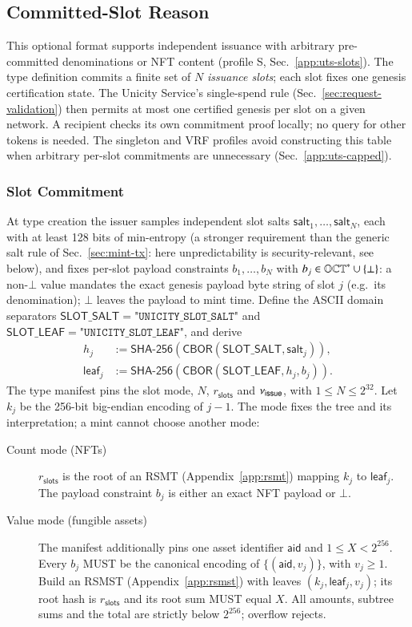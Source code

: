 \subsection{Committed-Slot Reason}\label{app:reason-slot}

This optional format supports independent issuance with arbitrary pre-committed denominations or NFT content (profile S, Sec.~\ref{app:uts-slots}). The type definition commits a finite set of $N$ \emph{issuance slots}; each slot fixes one genesis certification state. The Unicity Service's single-spend rule (Sec.~\ref{sec:request-validation}) then permits at most one certified genesis per slot on a given network. A recipient checks its own commitment proof locally; no query for other tokens is needed. The singleton and VRF profiles avoid constructing this table when arbitrary per-slot commitments are unnecessary (Sec.~\ref{app:uts-capped}).

\subsubsection{Slot Commitment}

At type creation the issuer samples independent slot salts $\mathsf{salt}_1, \ldots, \mathsf{salt}_N$, each with at least 128 bits of min-entropy (a stronger requirement than the generic salt rule of Sec.~\ref{sec:mint-tx}: here unpredictability is security-relevant, see below), and fixes per-slot payload constraints $b_1, \ldots, b_N$ with $b_j \in \mathbb{OCT}^{\ast} \cup\{\bot\}$: a non-$\bot$ value mandates the exact genesis payload byte string of slot $j$ (e.g.\ its denomination); $\bot$ leaves the payload to mint time. Define the ASCII domain separators $\mathsf{SLOT\_SALT} = \texttt{"UNICITY\_SLOT\_SALT"}$ and $\mathsf{SLOT\_LEAF} = \texttt{"UNICITY\_SLOT\_LEAF"}$, and derive
\[
\begin{aligned}
h_j &:= \mathsf{SHA\text{-}256}(\mathsf{CBOR}(\mathsf{SLOT\_SALT}, \mathsf{salt}_j)),\\
\mathsf{leaf}_j &:= \mathsf{SHA\text{-}256}(\mathsf{CBOR}(\mathsf{SLOT\_LEAF}, h_j, b_j)).
\end{aligned}
\]
The type manifest pins the slot mode, $N$, $r_\mathsf{slots}$ and $\nu_\mathsf{issue}$, with $1 \le N \le 2^{32}$. Let $k_j$ be the 256-bit big-endian encoding of $j-1$. The mode fixes the tree and its interpretation; a mint cannot choose another mode:
\begin{description}
	\item[Count mode (NFTs)] $r_\mathsf{slots}$ is the root of an RSMT (Appendix~\ref{app:rsmt}) mapping $k_j$ to $\mathsf{leaf}_j$. The payload constraint $b_j$ is either an exact NFT payload or $\bot$.
	\item[Value mode (fungible assets)] The manifest additionally pins one asset identifier $\mathsf{aid}$ and $1 \le X < 2^{256}$. Every $b_j$ MUST be the canonical encoding of $\{(\mathsf{aid},v_j)\}$, with $v_j \ge 1$. Build an RSMST (Appendix~\ref{app:rsmst}) with leaves $(k_j,\mathsf{leaf}_j,v_j)$; its root hash is $r_\mathsf{slots}$ and its root sum MUST equal $X$. All amounts, subtree sums and the total are strictly below $2^{256}$; overflow rejects.
\end{description}

